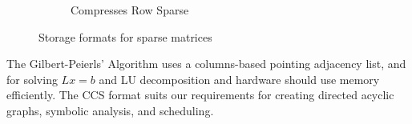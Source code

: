 \begin{figure}[H]
\begin{subfigure}[b]{0.49\textwidth}
        \centering
        \caption{Compresses Row Sparse}
        \label{fig:sparseDS:ccs}
    \end{subfigure}
    \caption{Storage formats for sparse matrices}
    \label{fig:sparseDS:formatsExample}
\end{figure}
The Gilbert-Peierls’ Algorithm uses a columns-based pointing adjacency list, and for solving $Lx=b$ and LU decomposition and hardware should use memory efficiently. The CCS format suits our requirements for creating directed acyclic graphs, symbolic analysis, and scheduling.